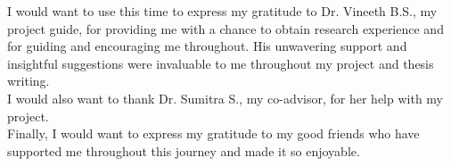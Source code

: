 I would want to use this time to express my gratitude to Dr. Vineeth B.S., my project guide, for providing me with a chance to obtain research experience and for guiding and encouraging me throughout. 
His unwavering support and insightful suggestions were invaluable to me throughout my project and thesis writing.\\

\hspace*{-0.7cm}I would also want to thank Dr. Sumitra S., my co-advisor, for her help with my project.\\

\hspace*{-0.7cm}Finally, I would want to express my gratitude to my good friends who have supported me throughout this journey and made it so enjoyable.

\vspace{15mm}
\hfill \Author \hspace{5mm}
